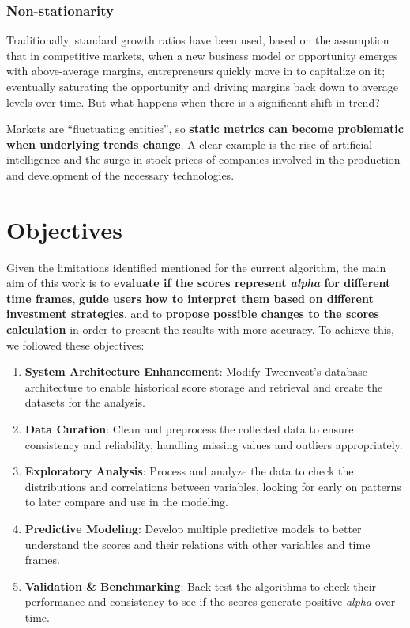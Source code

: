 \documentclass[11pt,english,a4paper,hidelinks]{book}
\begin{document}
\subsubsection{Non-stationarity}

\noindent Traditionally, standard growth ratios have been used, based on the assumption that in competitive markets, when a new business model or opportunity emerges with above-average margins, entrepreneurs quickly move in to capitalize on it; eventually saturating the opportunity and driving margins back down to average levels over time. But what happens when there is a significant shift in trend? 

\vspace{0.5cm}
\noindent Markets are ``fluctuating entities'', so \textbf{static metrics can become problematic when underlying trends change}. A clear example is the rise of artificial intelligence and the surge in stock prices of companies involved in the production and development of the necessary technologies.

\section{Objectives}

\noindent Given the limitations identified mentioned for the current algorithm, the main aim of this work is to \textbf{evaluate if the scores represent \textit{alpha} for different time frames}, \textbf{guide users how to interpret them based on different investment strategies}, and to \textbf{propose possible changes to the scores calculation} in order to present the results with more accuracy. To achieve this, we followed these objectives:

\begin{enumerate}
  \item \textbf{System Architecture Enhancement}: Modify Tweenvest's database architecture to enable historical score storage and retrieval and create the datasets for the analysis.
  \item \textbf{Data Curation}: Clean and preprocess the collected data to ensure consistency and reliability, handling missing values and outliers appropriately.
  \item \textbf{Exploratory Analysis}: Process and analyze the data to check the distributions and correlations between variables, looking for early on patterns to later compare and use in the modeling.
  \item \textbf{Predictive Modeling}: Develop multiple predictive models to better understand the scores and their relations with other variables and time frames.
  \item \textbf{Validation \& Benchmarking}: Back-test the algorithms to check their performance and consistency to see if the scores generate positive \textit{alpha} over time.
\end{enumerate}
\end{document}
